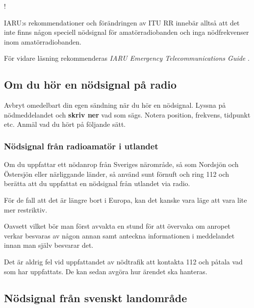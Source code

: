 \begin{center}
\begin{minipage}{0.19\columnwidth}
\Huge{\Huge{\hspace{1ex}!}}
\end{minipage}
\begin{minipage}{0.7\columnwidth}
IARU:s rekommendationer och förändringen av ITU RR innebär alltså att
det inte finns någon speciell nödsignal för amatörradiobanden och inga
nödfrekvenser inom amatörradiobanden.
\end{minipage}
\end{center}

För vidare läsning rekommenderas
\emph{IARU Emergency Telecommunications Guide} \cite{IARU-ETG}.

\newpage %
\subsection{Om du hör en nödsignal på radio}
\label{hör_nödtrafik}

Avbryt omedelbart din egen sändning när du hör en nödsignal. Lyssna på
nödmeddelandet och \textbf{skriv ner} vad som sägs.
Notera position, frekvens, tidpunkt etc. Anmäl vad du hört på följande sätt.

\subsubsection{Nödsignal från radioamatör i utlandet}

Om du uppfattar ett nödanrop från Sveriges närområde, så som Nordsjön och
Östersjön eller närliggande länder, så använd sunt förnuft och ring 112 och
berätta att du uppfattat en nödsignal från utlandet via radio.

För de fall att det är längre bort i Europa, kan det kanske vara läge att vara
lite mer restriktiv.

Oavsett vilket bör man först avvakta en stund för att övervaka om anropet verkar
besvaras av någon annan samt anteckna informationen i meddelandet innan man
själv besvarar det.

Det är aldrig fel vid uppfattandet av nödtrafik att kontakta 112 och påtala vad
som har uppfattats.
De kan sedan avgöra hur ärendet ska hanteras.

\subsection{Nödsignal från svenskt landområde}
\label{sv. nödsignal}

